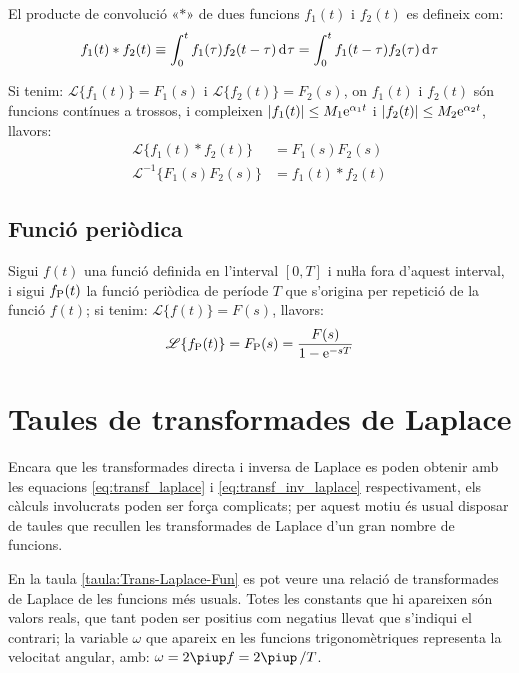 El producte de convolució «$*$» de dues funcions $f_1(t)$ i $f_2(t)$ es
defineix com:
\begin{equation}
    f_1(t) * f_2(t) \equiv \int_0^t f_1(\tau) f_2(t-\tau) \diff\tau =
    \int_0^t f_1(t-\tau) f_2(\tau) \diff\tau
\end{equation}

Si tenim: $\mathscr{L} \{f_1(t) \} = F_1(s)$ i $\mathscr{L}
\{f_2(t) \} = F_2(s)$, on $f_1(t)$ i $f_2(t)$ són funcions
contínues a trossos, i compleixen $|f_1(t)|\leq M_1\mathrm{e}^{\alpha_1 t}$
i $|f_2(t)|\leq M_2\mathrm{e}^{\alpha_2 t}$, llavors:
\begin{align}
    \mathscr{L} \{ f_1(t) * f_2(t) \} &= F_1(s) F_2(s)\\
    \mathscr{L}^{-1} \{ F_1(s) F_2(s) \} &= f_1(t) * f_2(t)
\end{align}

\subsection{Funció periòdica}

Sigui $f(t)$ una funció definida en l'interval $[0,T]$ i nuŀla
fora d'aquest interval, i sigui $f_\mathrm{P}(t)$ la funció periòdica de
període $T$ que s'origina per repetició de la funció $f(t)$; si
tenim: $\mathscr{L} \{f(t) \} = F(s)$, llavors:
\begin{equation}
   \mathscr{L} \{f_\mathrm{P}(t) \} = F_\mathrm{P}(s) = \frac{F(s)}{1-\mathrm{e}^{-sT}}
\end{equation}

\section{Taules de transformades de Laplace}

Encara que les transformades directa i inversa de Laplace es poden
obtenir amb les equacions \eqref{eq:transf_laplace} i
\eqref{eq:transf_inv_laplace} respectivament, els càlculs
involucrats poden ser força complicats; per aquest motiu és usual
disposar de taules que recullen les transformades de Laplace d'un
gran nombre de funcions.

En la taula \vref{taula:Trans-Laplace-Fun} es pot veure una relació de
transformades de Laplace de les funcions més usuals. Totes les
constants que hi apareixen són valors reals, que tant poden ser
positius com negatius llevat que s'indiqui el contrari; la variable
$\omega$ que apareix en les funcions trigonomètriques representa la
velocitat angular, amb: $\omega=2\piup f=2\piup\,/T$.

